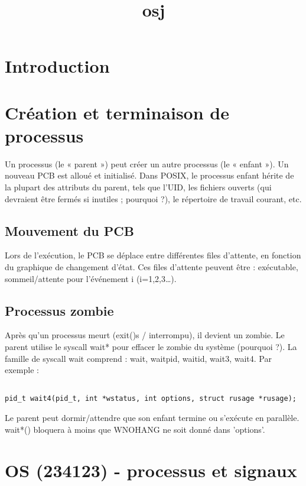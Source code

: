 \documentclass[12pt]{report}
\title{osj}
\author{}
\begin{document}
\maketitle
\tableofcontents
\newpage

\section{Introduction}
\section{Création et terminaison de processus}

Un processus (le « parent ») peut créer un autre processus (le « enfant »). Un nouveau PCB est alloué et initialisé. Dans POSIX, le processus enfant hérite de la plupart des attributs du parent, tels que l'UID, les fichiers ouverts (qui devraient être fermés si inutiles ; pourquoi ?), le répertoire de travail courant, etc.

\subsection{Mouvement du PCB}

Lors de l'exécution, le PCB se déplace entre différentes files d'attente, en fonction du graphique de changement d'état. Ces files d'attente peuvent être : exécutable, sommeil/attente pour l'événement i (i=1,2,3…).

\subsection{Processus zombie}

Après qu'un processus meurt (exit()s / interrompu), il devient un zombie. Le parent utilise le syscall wait* pour effacer le zombie du système (pourquoi ?). La famille de syscall wait comprend : wait, waitpid, waitid, wait3, wait4. Par exemple :

\begin{lstlisting}

pid_t wait4(pid_t, int *wstatus, int options, struct rusage *rusage);

\end{lstlisting}

Le parent peut dormir/attendre que son enfant termine ou s'exécute en parallèle. wait*() bloquera à moins que WNOHANG ne soit donné dans 'options'.

\section{OS (234123) - processus et signaux}
\end{document}
